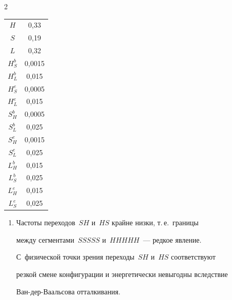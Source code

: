 \begin{multicols}{2}
{\begin{center}
\begin{tabular}{|c|c|}
$H$&0,33\hphantom{9}\\

$S$&0,19\hphantom{9}\\

$L$&0,32\hphantom{9}\\

$H_S^b$&\hphantom{9}0,0015\\

$H_L^b$&0,015\\

$H_S^e$&\hphantom{9}0,0005\\

$H_L^e$&0,015\\

$S_H^b$&\hphantom{9}0,0005\\

$S_L^b$&0,025\\

$S_H^e$&\hphantom{9}0,0015\\

$S_L^e$& 0,025\\

$L_H^b$&0,015\\

$L_S^b$&0,025\\

$L_H^e$&0,015\\

$L_S^e$&0,025\\

\hline

\end{tabular}

\end{center}}

\vspace*{12pt}



\addtocounter{table}{1}



\begin{enumerate}[4.]\item Частоты переходов~$SH$ и~$HS$ крайне низки, т.\,е.\ границы 

между сегментами~$SSSSS$  и~$HHHHH$~--- редкое явление. 

С~физической точки зрения переходы~$SH$ и~$HS$ соответствуют 

резкой смене конфигурации и энергетически невыгодны вследствие 

Ван-дер-Вааль\-со\-ва отталкивания.


\end{enumerate}
\end{multicols}
